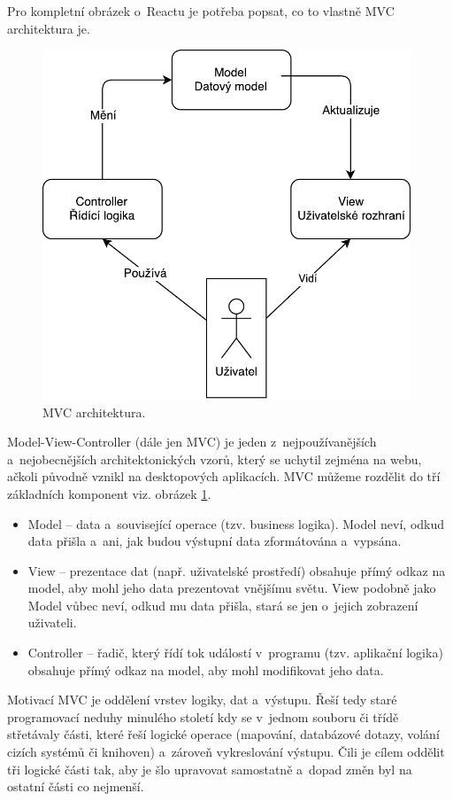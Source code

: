 
Pro kompletní obrázek o~Reactu je potřeba popsat, co to vlastně MVC architektura je.

\begin{figure}[H]
	\centering
	\includegraphics[width=11cm]{../MVC.pdf}
	\caption{MVC architektura.}
	\label{fig:MVC}
\end{figure}

Model-View-Controller (dále jen MVC) je jeden z~nejpoužívanějších a~nejobecnějších architektonických vzorů, který se uchytil zejména na webu, ačkoli původně vznikl na desktopových aplikacích. MVC můžeme rozdělit do tří základních komponent viz. obrázek \ref{fig:MVC}. 

\begin{itemize}  
	\item Model – data a~související operace (tzv. business logika). Model neví, odkud data přišla a~ani, jak budou výstupní data zformátována a~vypsána.
	\item View – prezentace dat (např. uživatelské prostředí) obsahuje přímý odkaz na model, aby mohl jeho data prezentovat vnějšímu světu. View podobně jako Model vůbec neví, odkud mu data přišla, stará se jen o~jejich zobrazení uživateli.
	\item Controller – řadič, který řídí tok událostí v~programu (tzv. aplikační logika) obsahuje přímý odkaz na model, aby mohl modifikovat jeho data.
\end{itemize}

Motivací MVC je oddělení vrstev logiky, dat a~výstupu. Řeší tedy staré programovací neduhy minulého století kdy se v~jednom souboru či třídě střetávaly části, které řeší logické operace (mapování, databázové dotazy, volání cizích systémů či knihoven) a~zároveň vykreslování výstupu. Čili je cílem oddělit tři logické části tak, aby je šlo upravovat samostatně a~dopad změn byl na ostatní části co nejmenší. 

